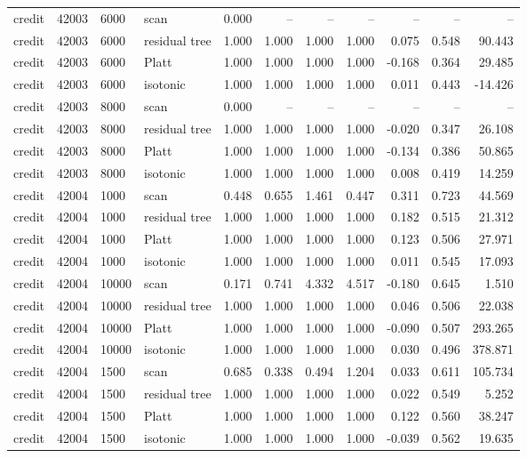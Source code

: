 \begin{tabular}{lrllrrrrrrr}
credit & 42003 & 6000 & scan & 0.000 & -- & -- & -- & -- & -- & -- \\
credit & 42003 & 6000 & residual tree & 1.000 & 1.000 & 1.000 & 1.000 & 0.075 & 0.548 & 90.443 \\
credit & 42003 & 6000 & Platt & 1.000 & 1.000 & 1.000 & 1.000 & -0.168 & 0.364 & 29.485 \\
credit & 42003 & 6000 & isotonic & 1.000 & 1.000 & 1.000 & 1.000 & 0.011 & 0.443 & -14.426 \\
credit & 42003 & 8000 & scan & 0.000 & -- & -- & -- & -- & -- & -- \\
credit & 42003 & 8000 & residual tree & 1.000 & 1.000 & 1.000 & 1.000 & -0.020 & 0.347 & 26.108 \\
credit & 42003 & 8000 & Platt & 1.000 & 1.000 & 1.000 & 1.000 & -0.134 & 0.386 & 50.865 \\
credit & 42003 & 8000 & isotonic & 1.000 & 1.000 & 1.000 & 1.000 & 0.008 & 0.419 & 14.259 \\
credit & 42004 & 1000 & scan & 0.448 & 0.655 & 1.461 & 0.447 & 0.311 & 0.723 & 44.569 \\
credit & 42004 & 1000 & residual tree & 1.000 & 1.000 & 1.000 & 1.000 & 0.182 & 0.515 & 21.312 \\
credit & 42004 & 1000 & Platt & 1.000 & 1.000 & 1.000 & 1.000 & 0.123 & 0.506 & 27.971 \\
credit & 42004 & 1000 & isotonic & 1.000 & 1.000 & 1.000 & 1.000 & 0.011 & 0.545 & 17.093 \\
credit & 42004 & 10000 & scan & 0.171 & 0.741 & 4.332 & 4.517 & -0.180 & 0.645 & 1.510 \\
credit & 42004 & 10000 & residual tree & 1.000 & 1.000 & 1.000 & 1.000 & 0.046 & 0.506 & 22.038 \\
credit & 42004 & 10000 & Platt & 1.000 & 1.000 & 1.000 & 1.000 & -0.090 & 0.507 & 293.265 \\
credit & 42004 & 10000 & isotonic & 1.000 & 1.000 & 1.000 & 1.000 & 0.030 & 0.496 & 378.871 \\
credit & 42004 & 1500 & scan & 0.685 & 0.338 & 0.494 & 1.204 & 0.033 & 0.611 & 105.734 \\
credit & 42004 & 1500 & residual tree & 1.000 & 1.000 & 1.000 & 1.000 & 0.022 & 0.549 & 5.252 \\
credit & 42004 & 1500 & Platt & 1.000 & 1.000 & 1.000 & 1.000 & 0.122 & 0.560 & 38.247 \\
credit & 42004 & 1500 & isotonic & 1.000 & 1.000 & 1.000 & 1.000 & -0.039 & 0.562 & 19.635 \\

\end{tabular}
